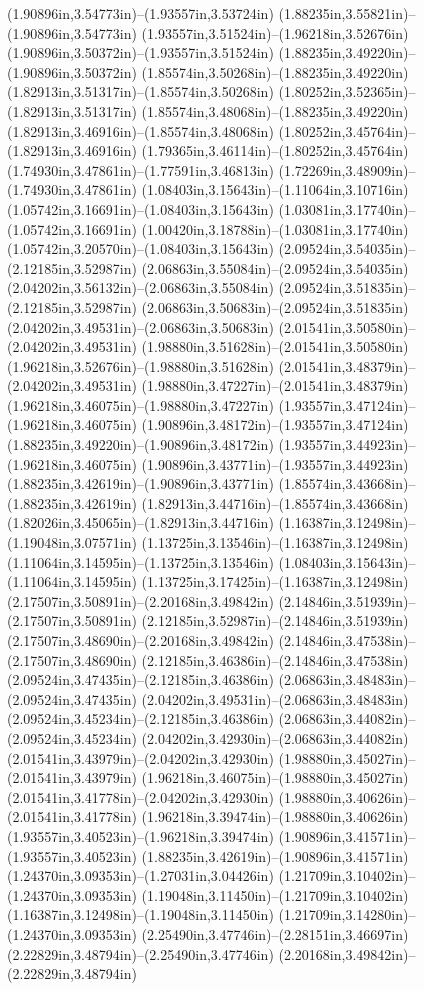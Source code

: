 (1.90896in,3.54773in)--(1.93557in,3.53724in) (1.88235in,3.55821in)--(1.90896in,3.54773in) (1.93557in,3.51524in)--(1.96218in,3.52676in) (1.90896in,3.50372in)--(1.93557in,3.51524in) (1.88235in,3.49220in)--(1.90896in,3.50372in) (1.85574in,3.50268in)--(1.88235in,3.49220in) (1.82913in,3.51317in)--(1.85574in,3.50268in) (1.80252in,3.52365in)--(1.82913in,3.51317in) (1.85574in,3.48068in)--(1.88235in,3.49220in) (1.82913in,3.46916in)--(1.85574in,3.48068in) (1.80252in,3.45764in)--(1.82913in,3.46916in) (1.79365in,3.46114in)--(1.80252in,3.45764in) (1.74930in,3.47861in)--(1.77591in,3.46813in) (1.72269in,3.48909in)--(1.74930in,3.47861in) (1.08403in,3.15643in)--(1.11064in,3.10716in) (1.05742in,3.16691in)--(1.08403in,3.15643in) (1.03081in,3.17740in)--(1.05742in,3.16691in) (1.00420in,3.18788in)--(1.03081in,3.17740in) (1.05742in,3.20570in)--(1.08403in,3.15643in) (2.09524in,3.54035in)--(2.12185in,3.52987in) (2.06863in,3.55084in)--(2.09524in,3.54035in) (2.04202in,3.56132in)--(2.06863in,3.55084in) (2.09524in,3.51835in)--(2.12185in,3.52987in) (2.06863in,3.50683in)--(2.09524in,3.51835in) (2.04202in,3.49531in)--(2.06863in,3.50683in) (2.01541in,3.50580in)--(2.04202in,3.49531in) (1.98880in,3.51628in)--(2.01541in,3.50580in) (1.96218in,3.52676in)--(1.98880in,3.51628in) (2.01541in,3.48379in)--(2.04202in,3.49531in) (1.98880in,3.47227in)--(2.01541in,3.48379in) (1.96218in,3.46075in)--(1.98880in,3.47227in) (1.93557in,3.47124in)--(1.96218in,3.46075in) (1.90896in,3.48172in)--(1.93557in,3.47124in) (1.88235in,3.49220in)--(1.90896in,3.48172in) (1.93557in,3.44923in)--(1.96218in,3.46075in) (1.90896in,3.43771in)--(1.93557in,3.44923in) (1.88235in,3.42619in)--(1.90896in,3.43771in) (1.85574in,3.43668in)--(1.88235in,3.42619in) (1.82913in,3.44716in)--(1.85574in,3.43668in) (1.82026in,3.45065in)--(1.82913in,3.44716in) (1.16387in,3.12498in)--(1.19048in,3.07571in) (1.13725in,3.13546in)--(1.16387in,3.12498in) (1.11064in,3.14595in)--(1.13725in,3.13546in) (1.08403in,3.15643in)--(1.11064in,3.14595in) (1.13725in,3.17425in)--(1.16387in,3.12498in) (2.17507in,3.50891in)--(2.20168in,3.49842in) (2.14846in,3.51939in)--(2.17507in,3.50891in) (2.12185in,3.52987in)--(2.14846in,3.51939in) (2.17507in,3.48690in)--(2.20168in,3.49842in) (2.14846in,3.47538in)--(2.17507in,3.48690in) (2.12185in,3.46386in)--(2.14846in,3.47538in) (2.09524in,3.47435in)--(2.12185in,3.46386in) (2.06863in,3.48483in)--(2.09524in,3.47435in) (2.04202in,3.49531in)--(2.06863in,3.48483in) (2.09524in,3.45234in)--(2.12185in,3.46386in) (2.06863in,3.44082in)--(2.09524in,3.45234in) (2.04202in,3.42930in)--(2.06863in,3.44082in) (2.01541in,3.43979in)--(2.04202in,3.42930in) (1.98880in,3.45027in)--(2.01541in,3.43979in) (1.96218in,3.46075in)--(1.98880in,3.45027in) (2.01541in,3.41778in)--(2.04202in,3.42930in) (1.98880in,3.40626in)--(2.01541in,3.41778in) (1.96218in,3.39474in)--(1.98880in,3.40626in) (1.93557in,3.40523in)--(1.96218in,3.39474in) (1.90896in,3.41571in)--(1.93557in,3.40523in) (1.88235in,3.42619in)--(1.90896in,3.41571in) (1.24370in,3.09353in)--(1.27031in,3.04426in) (1.21709in,3.10402in)--(1.24370in,3.09353in) (1.19048in,3.11450in)--(1.21709in,3.10402in) (1.16387in,3.12498in)--(1.19048in,3.11450in) (1.21709in,3.14280in)--(1.24370in,3.09353in) (2.25490in,3.47746in)--(2.28151in,3.46697in) (2.22829in,3.48794in)--(2.25490in,3.47746in) (2.20168in,3.49842in)--(2.22829in,3.48794in) 